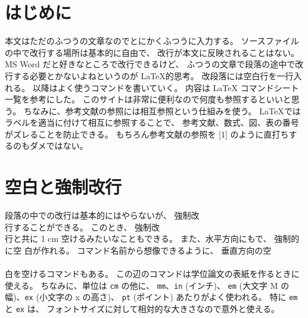 \documentclass[14pt,a4j]{jsarticle}
\begin{document}
\section{はじめに}
本文はただのふつうの文章なのでとにかくふつうに入力する。
ソースファイルの中で改行する場所は基本的に自由で、
改行が本文に反映されることはない。
MS Word だと好きなところで改行できるけど、
ふつうの文章で段落の途中で改行する必要とかないよねというのが \LaTeX 的思考。
改段落には空白行を一行入れる。
以降はよく使うコマンドを書いていく。
内容は LaTeX コマンドシート一覧\cite{list_commands}を参考にした。
このサイトは非常に便利なので何度も参照するといいと思う。
ちなみに、参考文献の参照には相互参照という仕組みを使う。
\LaTeX ではラベルを適当に付けて相互に参照することで、
参考文献、数式、図、表の番号がズレることを防止できる。
もちろん参考文献の参照を [1] のように直打ちするのもダメではない。
%
\section{空白と強制改行}
段落の中での改行は基本的にはやらないが、
強制改 \\ 行することができる。
このとき、
強制改 \\[1cm] 行と共に 1 cm 空けるみたいなこともできる。
また、水平方向にもで、
強制的に空 \hspace{1cm} 白が作れる。
コマンド名前から想像できるように、
垂直方向の空 \\ \vspace{1cm} \\ 白を空けるコマンドもある。
この辺のコマンドは学位論文の表紙を作るときに使える。
ちなみに、単位は \texttt{cm} の他に、
\texttt{mm}、\texttt{in} (インチ)、
\texttt{em} (大文字 M の幅)、\texttt{ex} (小文字の x の高さ)、
\texttt{pt} (ポイント) あたりがよく使われる。
特に \texttt{em} と \texttt{ex} は、
フォントサイズに対して相対的な大きさなので意外と使える。
%
\end{document}
